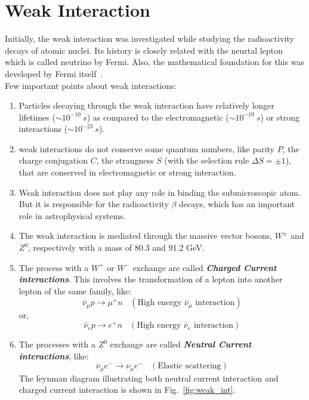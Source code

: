 \section{Weak Interaction} %
\label{sec:weak_interaction}
Initially, the weak interaction was investigated while studying the radioactivity decays of atomic nuclei. Its history is closely related with the neurtal lepton which is called neutrino by Fermi. Also, the mathematical foundation for this was developed by Fermi itself~\cite{Braibant2012}.\\
Few important points about weak interactions:
\begin{enumerate}
	\item Particles decaying through the weak interaction have relatively longer lifetimes ($\sim 10^{-10}~s$) as compared to the electromagnetic ($\sim 10^{-19}~s$) or strong interactions ($\sim 10^{-23}~s$).
	\item weak interactions do not conserve some quantum numbers, like parity $P$, the charge conjugation $C$, the strangness $S$ (with the selection rule $\Delta S = \pm 1$), that are conserved in electromagnetic or strong interaction.
	\item Weak interaction does not play any role in binding the submicroscopic atom. But it is responsible for the radioactivity $\beta$ decays, which has an important role in astrophysical systems.
	\item The weak interaction is mediated through the massive vector bosons, $W^{\pm}$ and $Z^0$, respectively with a mass of 80.3 and 91.2 GeV.
	\item The process with a $W^+$ or $W^-$ exchange are called \textbf{\textit{Charged Current interactions}}. This involves the transformation of a lepton into another lepton of the same family, like: \begin{equation}
		\bar{\nu}_{\mu} p \rightarrow \mu^+ n ~~~~(\text{High energy $\bar{\nu}_{\mu}$ interaction})
	\end{equation} or, \begin{equation}
		\bar{\nu}_{e} p \rightarrow e^+ n ~~~~(\text{High energy $\bar{\nu}_e$ interaction})
	\end{equation}
	\item The processes with a $Z^0$ exchange are called \textbf{\textit{Neutral Current interactions}}, like: \begin{equation}
		\bar{\nu}_{\mu} e^- \rightarrow \nu_{\mu} e^- ~~~~(\text{Elastic scattering})
	\end{equation} The feynman diagram illustrating both neutral current interaction and charged current interaction is shown in Fig.~\ref{fig:weak_int}.

\end{enumerate}
